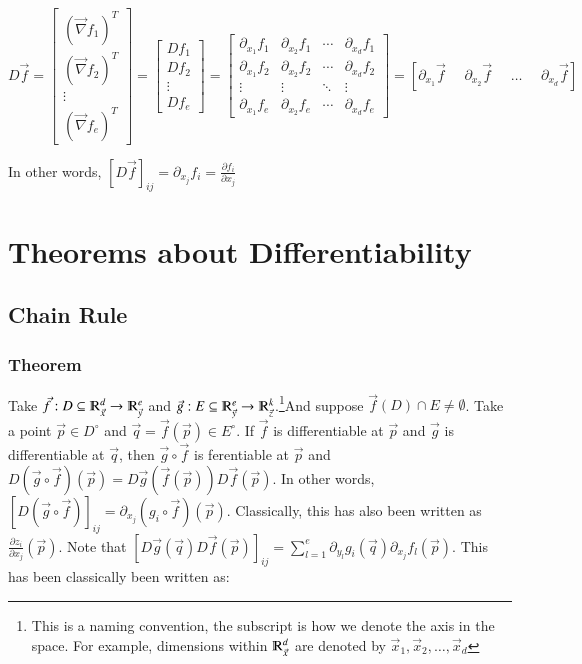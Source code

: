 \documentclass [12 pt, twoside] {book}
\newcommand\+{\text{ }}
\newcommand{\gradient}{\vec{\nabla}}
\begin{document}
\[
    D\vec{f} = \left[\begin{array}{c}
    (\gradient f_1)^T\\
    (\gradient f_2)^T\\
    \vdots\\
    (\gradient f_e)^T
    \end{array}\right] = \left[
        \begin{array}{c}
            Df_1 \\
            Df_2 \\
            \vdots\\
            Df_e
        \end{array}
    \right] = 
    \left[\begin{array}{cccc}
            \partial_{x_1} f_1 & \partial_{x_2} f_1 & \cdots &
            \partial_{x_d} f_1\\
            \partial_{x_1} f_2 & \partial_{x_2} f_2 & \cdots &
            \partial_{x_d} f_2\\
            \vdots & \vdots & \ddots & \vdots\\
            \partial_{x_1} f_e & \partial_{x_2} f_e & \cdots &
            \partial_{x_d} f_e
    \end{array}\right] =
    [\partial_{x_1} \vec{f} \+\+ \partial_{x_2} \vec{f} \+\+ \dots \+\+ \partial_{x_d}
    \vec{f}]
\]

In other words, $[D\vec{f}]_{ij} = \partial_{x_j} f_i = \frac{\partial
f_i}{\partial x_j}$

\section{Theorems about Differentiability}
\subsection{Chain Rule}
\subsubsection{Theorem}
Take $\vec{f} : D \subseteq \varmathbb{R}^d_{\vec{x}} \to
\varmathbb{R}^e_{\vec{y}}$ and $\vec{g}: E
\subseteq \varmathbb{R}^e_{\vec{y}} \to \varmathbb{R}^k_{\vec{z}}$.\footnote{This is a naming convention, the subscript
is how we denote the axis in the space. For example, dimensions within
$\varmathbb{R}^d_{\vec{x}}$ are denoted by $\vec{x}_1, \vec{x}_2, \dots,
\vec{x}_d$}And suppose $\vec{f}(D) \cap E
\neq \emptyset$. Take a point $\vec{p} \in D^\circ$ and $\vec{q} = \vec{f}(\vec{p}) \in
E^\circ$. If $\vec{f}$ is differentiable at $\vec{p}$ and $\vec{g}$ is
differentiable at $\vec{q}$, then $\vec{g} \circ \vec{f}$ is
ferentiable at $\vec{p}$ and $D(\vec{g} \circ \vec{f}) (\vec{p}) =
D\vec{g}(\vec{f}(\vec{p})) D\vec{f}(\vec{p})$. In other words, $[D(\vec{g} \circ
\vec{f})]_{ij} = \partial_{x_j}(g_i \circ \vec{f})(\vec{p})$. Classically, this
has also been written as $\frac{\partial z_i}{\partial x_j} (\vec{p})$. Note
that $[D\vec{g}(\vec{q}) D\vec{f}(\vec{p})]_{ij} = \sum_{l = 1}^e \partial_{y_l} g_i
(\vec{q}) \partial_{x_j} f_l (\vec{p})$. This has been classically been written
as:
\end{document}
